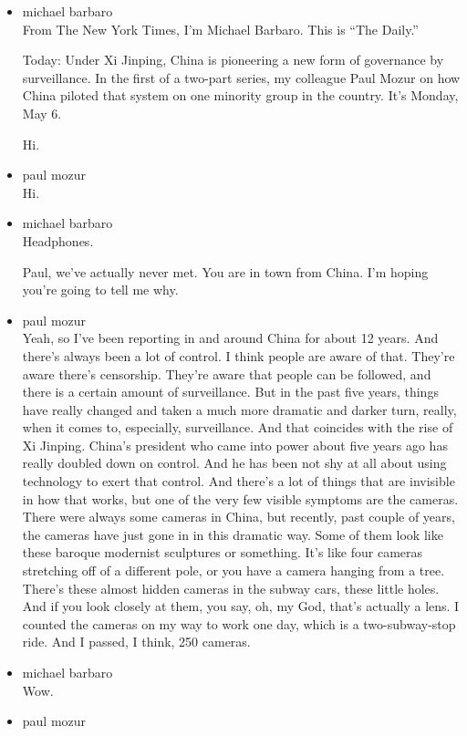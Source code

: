 \begin{itemize}
\item
  michael barbaro\\
  From The New York Times, I'm Michael Barbaro. This is ``The Daily.''

  Today: Under Xi Jinping, China is pioneering a new form of governance
  by surveillance. In the first of a two-part series, my colleague Paul
  Mozur on how China piloted that system on one minority group in the
  country. It's Monday, May 6.

  Hi.
\item
  paul mozur\\
  Hi.
\item
  michael barbaro\\
  Headphones.

  Paul, we've actually never met. You are in town from China. I'm hoping
  you're going to tell me why.
\item
  paul mozur\\
  Yeah, so I've been reporting in and around China for about 12 years.
  And there's always been a lot of control. I think people are aware of
  that. They're aware there's censorship. They're aware that people can
  be followed, and there is a certain amount of surveillance. But in the
  past five years, things have really changed and taken a much more
  dramatic and darker turn, really, when it comes to, especially,
  surveillance. And that coincides with the rise of Xi Jinping. China's
  president who came into power about five years ago has really doubled
  down on control. And he has been not shy at all about using technology
  to exert that control. And there's a lot of things that are invisible
  in how that works, but one of the very few visible symptoms are the
  cameras. There were always some cameras in China, but recently, past
  couple of years, the cameras have just gone in in this dramatic way.
  Some of them look like these baroque modernist sculptures or
  something. It's like four cameras stretching off of a different pole,
  or you have a camera hanging from a tree. There's these almost hidden
  cameras in the subway cars, these little holes. And if you look
  closely at them, you say, oh, my God, that's actually a lens. I
  counted the cameras on my way to work one day, which is a
  two-subway-stop ride. And I passed, I think, 250 cameras.
\item
  michael barbaro\\
  Wow.
\item
  paul mozur\\

\end{itemize}
